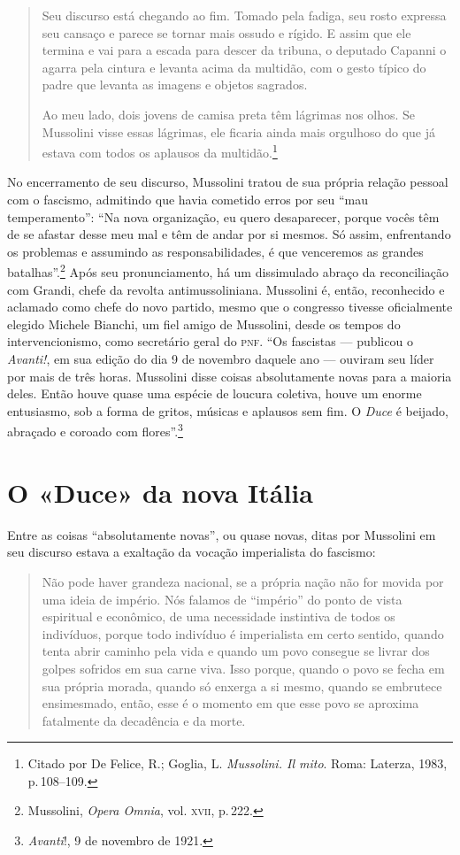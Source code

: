 \begin{quote}
Seu discurso está chegando ao fim. Tomado pela fadiga, seu rosto
expressa seu cansaço e parece se tornar mais ossudo e rígido. E assim
que ele termina e vai para a escada para descer da tribuna, o deputado
Capanni o agarra pela cintura e levanta acima da multidão, com o gesto
típico do padre que levanta as imagens e objetos sagrados.

Ao meu lado, dois jovens de camisa preta têm lágrimas nos olhos. Se
Mussolini visse essas lágrimas, ele ficaria ainda mais orgulhoso do que
já estava com todos os aplausos da multidão.\footnote{Citado por De
  Felice, R.; Goglia, L. \emph{Mussolini. Il mito}. Roma: Laterza, 1983,
  p.\,108--109.}
\end{quote}

No encerramento de seu discurso, Mussolini tratou de sua própria relação
pessoal com o fascismo, admitindo que havia cometido erros por seu ``mau
temperamento'': ``Na nova organização, eu quero desaparecer, porque vocês
têm de se afastar desse meu mal e têm de andar por si mesmos. Só assim,
enfrentando os problemas e assumindo as responsabilidades, é que
venceremos as grandes batalhas''.\footnote{Mussolini, \emph{Opera Omnia},
  vol. \textsc{xvii}, p.\,222.} Após seu pronunciamento, há um dissimulado abraço
da reconciliação com Grandi, chefe da revolta antimussoliniana.
Mussolini é, então, reconhecido e aclamado como chefe do novo partido,
mesmo que o congresso tivesse oficialmente elegido Michele Bianchi, um
fiel amigo de Mussolini, desde os tempos do intervencionismo, como
secretário geral do \textsc{pnf}. ``Os fascistas --- publicou o \emph{Avanti!}, em
sua edição do dia 9 de novembro daquele ano --- ouviram seu líder por
mais de três horas. Mussolini disse coisas absolutamente novas para a
maioria deles. Então houve quase uma espécie de loucura coletiva, houve
um enorme entusiasmo, sob a forma de gritos, músicas e aplausos sem fim.
O \emph{Duce} é beijado, abraçado e coroado com flores''.\footnote{\emph{Avanti}!,
  9 de novembro de 1921.}

\section{O «Duce» da nova Itália}

Entre as coisas ``absolutamente novas'', ou quase novas, ditas por
Mussolini em seu discurso estava a exaltação da vocação imperialista do
fascismo:

\begin{quote}
Não pode haver grandeza nacional, se a própria nação não for movida por
uma ideia de império. Nós falamos de ``império'' do ponto de vista
espiritual e econômico, de uma necessidade instintiva de todos os
indivíduos, porque todo indivíduo é imperialista em certo sentido,
quando tenta abrir caminho pela vida e quando um povo consegue se livrar
dos golpes sofridos em sua carne viva. Isso porque, quando o povo se
fecha em sua própria morada, quando só enxerga a si mesmo, quando se
embrutece ensimesmado, então, esse é o momento em que esse povo se
aproxima fatalmente da decadência e da morte.
\end{quote}

